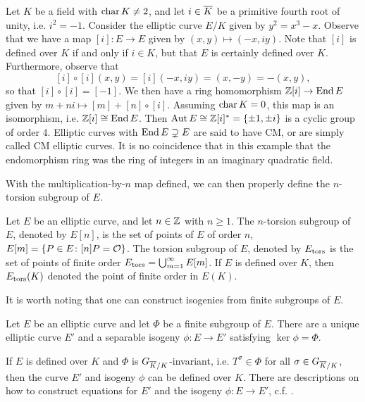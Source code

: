 \begin{ex}
Let $K$ be a field with $\operatorname{char} K \neq 2$, and let $i \in \overline{K}$ be a primitive fourth root of unity, i.e. $i^2= -1$. Consider the elliptic curve $E/K$ given by $y^2= x^3 - x$. Observe that we have a map $[i]: E \to E$ given by $(x,y) \mapsto (-x,iy)$. Note that $[i]$ is defined over $K$ if and only if $i \in K$, but that $E$ is certainly defined over $K$. Furthermore, observe that
	\[
	[i] \circ [i](x,y)= [i](-x,iy)= (x,-y)= -(x,y),
	\]
so that $[i] \circ [i]= [-1]$. We then have a ring homomorphism $\mathbb{Z}[i] \to \operatorname{End} E$ given by $m + ni \mapsto [m] + [n] \circ [i]$. Assuming $\operatorname{char} K= 0$, this map is an isomorphism, i.e. $\mathbb{Z}[i] \cong \operatorname{End} E$. Then $\operatorname{Aut} E \cong \mathbb{Z}[i]^*= \{ \pm 1, \pm i \}$ is a cyclic group of order 4. Elliptic curves with $\operatorname{End} E \supsetneq E$ are said to have CM, or are simply called CM elliptic curves. It is no coincidence that in this example that the endomorphism ring was the ring of integers in an imaginary quadratic field. 
\end{ex}


With the multiplication-by-$n$ map defined, we can then properly define the $n$-torsion subgroup of $E$. 


\begin{dfn}
Let $E$ be an elliptic curve, and let $n \in \mathbb{Z}$ with $n \geq 1$. The $n$-torsion subgroup of $E$, denoted by $E[n]$, is the set of points of $E$ of order $n$, $E[m]= \{ P \in E \colon [n]P= \mathcal{O} \}$. The torsion subgroup of $E$, denoted by $E_{\text{tors}}$ is the set of points of finite order $E_{\text{tors}}= \bigcup_{m=1}^\infty E[m]$. If $E$ is defined over $K$, then $E_{\text{tors}}(K)$ denoted the point of finite order in $E(K)$. 
\end{dfn}


It is worth noting that one can construct isogenies from finite subgroups of $E$. 


\begin{prop} \label{prop:velulem}
Let $E$ be an elliptic curve and let $\Phi$ be a finite subgroup of $E$. There are a unique elliptic curve $E'$ and a separable isogeny $\phi: E \to E'$ satisfying $\ker \phi= \Phi$.
\end{prop}


If $E$ is defined over $K$ and $\Phi$ is $G_{\overline{K}/K}$-invariant, i.e. $T^\sigma \in \Phi$ for all $\sigma \in G_{\overline{K}/K}$, then the curve $E'$ and isogeny $\phi$ can be defined over $K$. There are descriptions on how to construct equations for $E'$ and the isogeny $\phi: E \to E'$, c.f. \cite{velu71}. 


